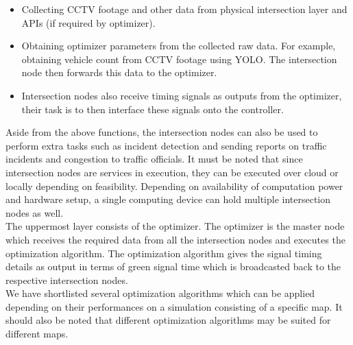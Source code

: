 \documentclass[openany,12pt]{report}
\begin{document}
\begin{itemize}
	\item{Collecting CCTV footage and other data from physical intersection layer and APIs (if required by optimizer).}
	\item{Obtaining optimizer parameters from the collected raw data. For example, obtaining vehicle count from CCTV footage using YOLO. The intersection node then forwards this data to the optimizer.}
	\item{Intersection nodes also receive timing signals as outputs from the optimizer, their task is to then interface these signals onto the controller.}
\end{itemize}

\hspace*{0.5in}Aside from the above functions, the intersection nodes can also be used to perform extra tasks such as incident detection and sending reports on traffic incidents and congestion to traffic officials. It must be noted that since intersection nodes are services in execution, they can be executed over cloud or locally depending on feasibility. Depending on availability of computation power and hardware setup, a single computing device can hold multiple intersection nodes as well.\\

\hspace*{0.5in}The uppermost layer consists of the optimizer. The optimizer is the master node which receives the required data from all the intersection nodes and executes the optimization algorithm. The optimization algorithm gives the signal timing details as output in terms of green signal time which is broadcasted back to the respective intersection nodes.\\

\hspace*{0.5in}We have shortlisted several optimization algorithms which can be applied depending on their performances on a simulation consisting of a specific map. It should also be noted that different optimization algorithms may be suited for different maps.\\
\end{document}
